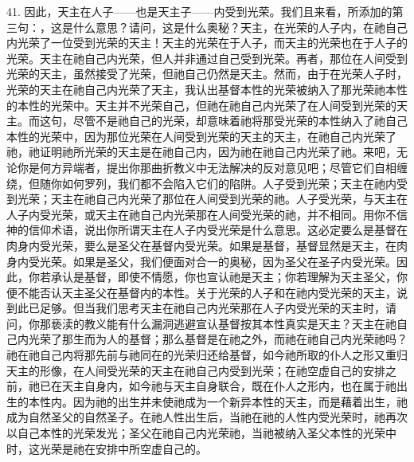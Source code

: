 41. 因此，天主在人子——也是天主子——内受到光荣。我们且来看，所添加的第三句：，这是什么意思？请问，这是什么奥秘？天主，在光荣的人子内，在祂自己内光荣了一位受到光荣的天主！天主的光荣在于人子，而天主的光荣也在于人子的光荣。天主在祂自己内光荣，但人并非通过自己受到光荣。再者，那位在人间受到光荣的天主，虽然接受了光荣，但祂自己仍然是天主。然而，由于在光荣人子时，光荣的天主在祂自己内光荣了天主，我认出基督本性的光荣被纳入了那光荣祂本性的本性的光荣中。天主并不光荣自己，但祂在祂自己内光荣了在人间受到光荣的天主。而这句，尽管不是祂自己的光荣，却意味着祂将那受光荣的本性纳入了祂自己本性的光荣中，因为那位光荣在人间受到光荣的天主的天主，在祂自己内光荣了祂，祂证明祂所光荣的天主是在祂自己内，因为祂在祂自己内光荣了祂。来吧，无论你是何方异端者，提出你那曲折教义中无法解决的反对意见吧；尽管它们自相缠绕，但随你如何罗列，我们都不会陷入它们的陷阱。人子受到光荣；天主在祂内受到光荣；天主在祂自己内光荣了那位在人间受到光荣的祂。人子受光荣，与天主在人子内受光荣，或天主在祂自己内光荣那在人间受光荣的祂，并不相同。用你不信神的信仰术语，说出你所谓天主在人子内受光荣是什么意思。这必定要么是基督在肉身内受光荣，要么是圣父在基督内受光荣。如果是基督，基督显然是天主，在肉身内受光荣。如果是圣父，我们便面对合一的奥秘，因为圣父在圣子内受光荣。因此，你若承认是基督，即使不情愿，你也宣认祂是天主；你若理解为天主圣父，你便不能否认天主圣父在基督内的本性。关于光荣的人子和在祂内受光荣的天主，说到此已足够。但当我们思考天主在祂自己内光荣那在人子内受光荣的天主时，请问，你那亵渎的教义能有什么漏洞逃避宣认基督按其本性真实是天主？天主在祂自己内光荣了那生而为人的基督；那么基督是在祂之外，而祂在祂自己内光荣祂吗？祂在祂自己内将那先前与祂同在的光荣归还给基督，如今祂所取的仆人之形又重归天主的形像，在人间受光荣的天主在祂自己内受到光荣；在祂空虚自己的安排之前，祂已在天主自身内，如今祂与天主自身联合，既在仆人之形内，也在属于祂出生的本性内。因为祂的出生并未使祂成为一个新异本性的天主，而是藉着出生，祂成为自然圣父的自然圣子。在祂人性出生后，当祂在祂的人性内受光荣时，祂再次以自己本性的光荣发光；圣父在祂自己内光荣祂，当祂被纳入圣父本性的光荣中时，这光荣是祂在安排中所空虚自己的。\par


